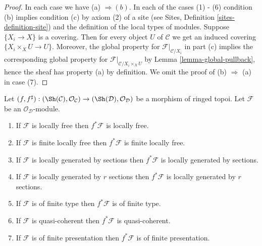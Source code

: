 \begin{proof}
In each case we have (a) $\Rightarrow (b)$. In each of the cases (1) - (6)
condition (b) implies condition (c) by axiom (2) of a site
(see Sites, Definition \ref{sites-definition-site})
and the definition of the local types of modules.
Suppose $\{X_i \to X\}$ is a covering.
Then for every object $U$ of $\mathcal{C}$ we get an
induced covering $\{X_i \times_X U \to U\}$. Moreover, the global
property for $\mathcal{F}|_{\mathcal{C}/X_i}$ in part (c) implies
the corresponding global property for
$\mathcal{F}|_{\mathcal{C}/X_i \times_X U}$ by
Lemma \ref{lemma-global-pullback}, hence the sheaf has property (a)
by definition. We omit the proof of (b) $\Rightarrow$ (a) in case (7).
\end{proof}

\begin{lemma}
\label{lemma-local-pullback}
Let
$(f, f^\sharp) :
(\Sh(\mathcal{C}), \mathcal{O}_\mathcal{C})
\to
(\Sh(\mathcal{D}), \mathcal{O}_\mathcal{D})$
be a morphism of ringed topoi.
Let $\mathcal{F}$ be an $\mathcal{O}_\mathcal{D}$-module.
\begin{enumerate}
\item If $\mathcal{F}$ is locally free then $f^*\mathcal{F}$ is locally free.
\item If $\mathcal{F}$ is finite locally free then $f^*\mathcal{F}$ is
finite locally free.
\item If $\mathcal{F}$ is locally generated by sections
then $f^*\mathcal{F}$ is locally generated by sections.
\item If $\mathcal{F}$ is locally generated by $r$ sections
then $f^*\mathcal{F}$ is locally generated by $r$ sections.
\item If $\mathcal{F}$ is of finite type
then $f^*\mathcal{F}$ is of finite type.
\item If $\mathcal{F}$ is quasi-coherent then
$f^*\mathcal{F}$ is quasi-coherent.
\item If $\mathcal{F}$ is of finite presentation
then $f^*\mathcal{F}$ is of finite presentation.
\end{enumerate}
\end{lemma}

